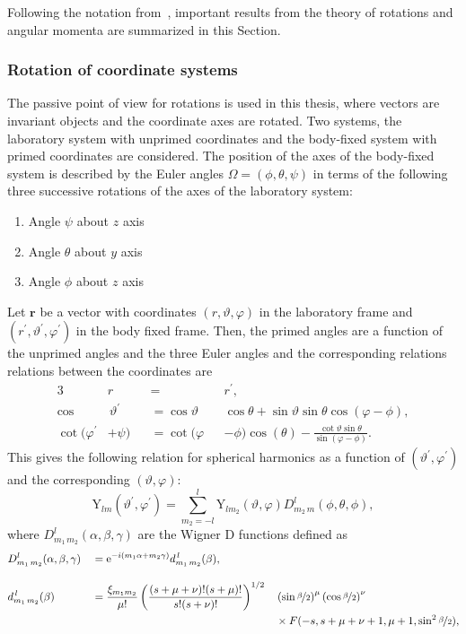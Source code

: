 Following the notation from~\cite{varshalovich1988}, important results from the theory of rotations and angular momenta are summarized in this Section.
\subsubsection*{Rotation of coordinate systems}
The passive point of view for rotations is used in this thesis, where vectors are invariant objects and the coordinate axes are rotated. Two systems, the laboratory system with unprimed coordinates and the body-fixed system with primed coordinates are considered. The position of the axes of the body-fixed system is described by the Euler angles $\Omega=(\phi,\theta,\psi)$ in terms of the following three successive rotations of the axes of the laboratory system:
\begin{enumerate}
\item Angle $\psi$ about $z$ axis
\item Angle $\theta$ about $y$ axis
\item Angle $\phi$ about $z$ axis
\end{enumerate}
Let $\mathbf{r}$ be a vector with coordinates $(r,\vartheta,\varphi)$ in the laboratory frame and $(r^\prime,\vartheta^\prime,\varphi^\prime)$ in the body fixed frame. Then, the primed angles are a function of the unprimed angles and the three Euler angles and the corresponding relations relations between the coordinates are
\begin{alignat}{3}
& r &&= &&r^\prime,\\
\cos&\,\vartheta^\prime &&= \cos\vartheta && \cos\theta + \sin\vartheta\sin\theta\cos(\varphi-\phi),\\
\cot (\varphi^\prime &+ \psi) &&= \cot (\varphi &&- \phi)\cos(\theta)-\frac{\cot\vartheta \sin\theta}{\sin(\varphi-\phi)}.
\end{alignat}
This gives the following relation for spherical harmonics as a function of $(\vartheta^\prime,\varphi^\prime)$ and the corresponding $(\vartheta,\varphi)$:
\begin{equation}
\label{eq:rot_sphHarm}
\text{Y}_{lm}(\vartheta^\prime,\varphi^\prime)=\sum_{m_2=-l}^l \text{Y}_{lm_2}(\vartheta,\varphi) D^l_{m_2\,m}(\phi,\theta,\phi),
\end{equation}
where $D^l_{m_1\,m_2}(\alpha,\beta,\gamma)$ are the Wigner D functions defined as
\begin{alignat}{3}
\label{app:defDfunction}
&D^l_{m_1\,m_2}(\alpha,\beta,\gamma) && = \text{e}^{-i(m_1\alpha+m_2\gamma)}d^{\,l}_{m_1\,m_2}(\beta),&&\\[10pt]
&d^{\,l}_{m_1\,m_2}(\beta)&& = \frac{\xi_{m_1m_2}}{\mu !}\left(\frac{(s+\mu+\nu)!(s+\mu)!}{s!(s+\nu)!}\right)^{1/2}&&\left(\sin \nicefrac{\beta}{2}\right)^\mu\left(\cos \nicefrac{\beta}{2}\right)^\nu\\
&&&&&\times F(-s,s+\mu+\nu+1,\mu+1,\sin^2\nicefrac{\beta}{2}),
\end{alignat}

